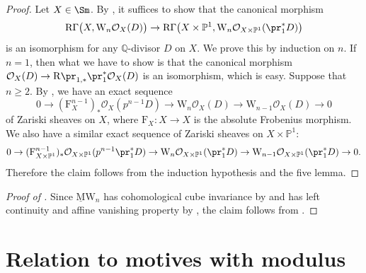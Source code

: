 \documentclass{amsart}
\theoremstyle{plain}
\theoremstyle{definition}
\theoremstyle{remark}
\numberwithin{equation}{section}
\def\RGamma{\mathrm{R}\Gamma}
\def\MW{\underline{\mathrm{M}}\mathrm{W}}
\begin{document}
\begin{proof}
    Let $X\in \Sm$.
    By , it suffices to show that the canonical morphism
    $$
        \RGamma\bigl(X,\mathrm{W}_n\mathcal{O}_X(D)\bigr)\to \RGamma\bigl(X\times\mathbb{P}^1,\mathrm{W}_n\mathcal{O}_{X\times\mathbb{P}^1}(\pr_1^*D)\bigr)
    $$
    is an isomorphism for any $\mathbb{Q}$-divisor $D$ on $X$.
    We prove this by induction on $n$.
    If $n=1$, then what we have to show is that the canonical morphism
    $\mathcal{O}_X(D)\to \mathrm{R}\pr_{1,*}\pr_1^*\mathcal{O}_X(D)$
    is an isomorphism, which is easy.
    Suppose that $n\geq 2$.
    By \cite[Proposition 3.7]{Tanaka_Witt}, we have an exact sequence
    $$
        0\to (\mathrm{F}^{n-1}_X)_*\mathcal{O}_X(p^{n-1}D)\to \mathrm{W}_n\mathcal{O}_X(D)\to \mathrm{W}_{n-1}\mathcal{O}_X(D)\to 0
    $$
    of Zariski sheaves on $X$, where $\mathrm{F}_X\colon X\to X$ is the absolute Frobenius morphism.
    We also have a similar exact sequence of Zariski sheaves on $X\times\mathbb{P}^1$:
    $$
        0\to (\mathrm{F}^{n-1}_{X\times \mathbb{P}^1})_*\mathcal{O}_{X\times \mathbb{P}^1}(p^{n-1}\pr_1^*D)\to \mathrm{W}_n\mathcal{O}_{X\times \mathbb{P}^1}(\pr_1^*D)\to \mathrm{W}_{n-1}\mathcal{O}_{X\times \mathbb{P}^1}(\pr_1^*D)\to 0.
    $$
    Therefore the claim follows from the induction hypothesis and the five lemma.
\end{proof}

\begin{proof}[Proof of ]
    Since $\MW_n$ has cohomological cube invariance by  and has left continuity and affine vanishing property by , the claim follows from .
\end{proof}








\section{Relation to motives with modulus}
\end{document}
